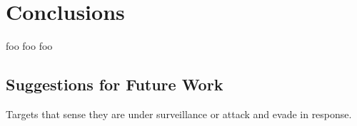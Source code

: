 \chapter{Conclusions}
foo foo foo

\section{Suggestions for Future Work}
Targets that sense they are under surveillance or attack and evade in response.